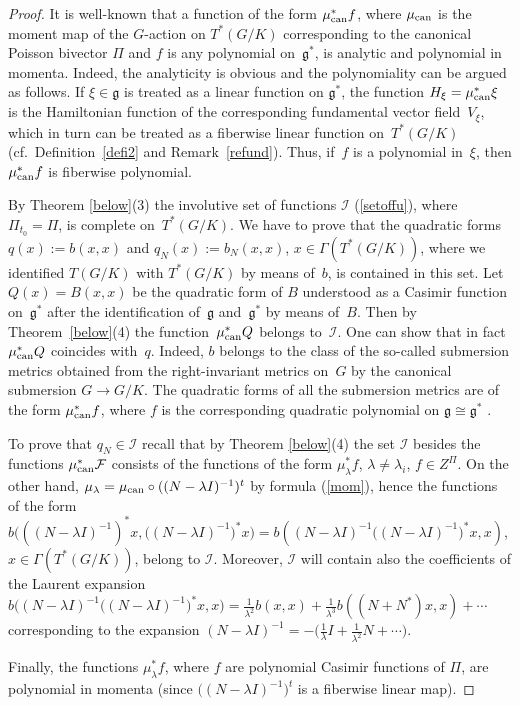\documentclass[pdftex]{sigma}
\numberwithin{equation}{section}
\begin{document}
\begin{proof} It is well-known that a function of the form $\mu_{\rm can}^*f$, where $\mu_{\rm can}$ is the moment map of the $G$-action on $T^*(G/K)$ corresponding to the canonical Poisson bivector $\Pi$ and $f$ is any polynomial on~$\mathfrak{g}^*$, is analytic and polynomial in momenta. Indeed, the analyticity is obvious and the polynomiality can be argued as follows. If $\xi\in\mathfrak{g}$ is treated as a linear function on $\mathfrak{g}^*$, the function $H_\xi=\mu_{\rm can}^*\xi$ is the Hamiltonian function of the corresponding fundamental vector field~$V_\xi$, which in turn can be treated as a fiberwise linear function on~$T^*(G/K)$ (cf.\ Definition~\ref{defi2} and Remark~\ref{refund}). Thus, if~$f$ is a polynomial in~$\xi$, then $\mu_{\rm can}^*f$ is fiberwise polynomial.

By Theorem \ref{below}(3) the involutive set of functions $\mathcal{I}$ (\ref{setoffu}), where $\Pi_{t_0}=\Pi$, is complete on~$T^*(G/K)$. We have to prove that the quadratic forms $q(x):=b(x,x)$ and $q_N(x):=b_N(x,x)$, $x\in \Gamma(T^*(G/K))$, where we identified $T(G/K)$ with $T^*(G/K)$ by means of~$b$, is contained in this set. Let $Q(x)=B(x,x)$ be the quadratic form of $B$ understood as a Casimir function on~$\mathfrak{g}^*$ after the identification of~$\mathfrak{g}$ and~$\mathfrak{g}^*$ by means of~$B$. Then by Theorem~\ref{below}(4) the function~$\mu_{\rm can}^*Q$ belongs to~$\mathcal{I}$. One can show that in fact $\mu_{\rm can}^*Q$ coincides with~$q$. Indeed, $b$ belongs to the class of the so-called submersion metrics obtained from the right-invariant metrics on~$G$ by the canonical submersion $G\to G/K$. The quadratic forms of all the submersion metrics are of the form $\mu_{\rm can}^*f$, where $f$ is the corresponding quadratic polynomial on $\mathfrak{g}\cong\mathfrak{g}^*$ \cite[Section~7]{bjObzor}.

To prove that $q_N\in \mathcal{I}$ recall that by Theorem \ref{below}(4) the set $\mathcal{I}$ besides the functions $\mu_{\rm can}^*\mathcal{F}$ consists of the functions of the form $\mu_\lambda^*f$, $\lambda\not=\lambda_i$, $f\in Z^\Pi$. On the other hand, $\mu_\lambda=\mu_{\rm can}\circ((N-\lambda I)^{-1})^t$ by formula (\ref{mom}), hence the functions of the form $b\big(((N-\lambda I)^{-1})^*x,\big((N-\lambda I)^{-1}\big)^*x\big)=b((N-\lambda I)^{-1}\big((N-\lambda I)^{-1}\big)^*x,x)$, $x\in \Gamma(T^*(G/K))$, belong to $\mathcal{I}$. Moreover, $\mathcal{I}$ will contain also the coefficients of the Laurent expansion $b\big((N-\lambda I)^{-1}\big((N-\lambda I)^{-1}\big)^*x,x\big)=\frac1{\lambda^2}b(x,x)+\frac1{\lambda^3}b((N+N^*)x,x)+\cdots$ corresponding to the expansion $(N-\lambda I)^{-1}=-\big(\frac1{\lambda}I +\frac1{\lambda^2}N+\cdots\big)$.

Finally, the functions $\mu_\lambda^*f$, where $f$ are polynomial Casimir functions of $\Pi$, are polynomial in momenta (since $\big((N-\lambda I)^{-1}\big)^t$ is a fiberwise linear map).
\end{proof}
\end{document}
